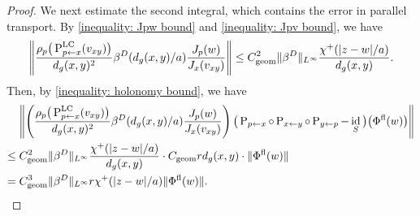\documentclass[a4paper,oneside,12pt]{amsart}
\theoremstyle{plain}
\theoremstyle{definition}
\theoremstyle{remark}
\DeclarePairedDelimiter{\abs}{\lvert}{\rvert}
\DeclarePairedDelimiter{\norm}{\lVert}{\rVert}
\DeclareMathOperator{\id}{id}
\newcommand{\paralleltransport}[2]{\operatorname{P}_{#2 \gets #1}}
\newcommand{\paralleltransportLC}[2]{\paralleltransport{#1}{#2}^{\mathrm{LC}}}
\newcommand{\cliffordmultiplication}{\rho}
\newcommand{\cutoff}{\beta}
\newcommand{\cutoffDirac}{\cutoff^D}
\newcommand{\cutoffupper}{\chi^+}
\newcommand{\flatmodel}[1]{#1^{\mathrm{fl}}}
\newcommand{\constantgeometric}{C_{\mathrm{geom}}}
\begin{document}
\begin{proof}
  We next estimate the second integral, which contains the error in parallel transport.
  By \eqref{inequality: Jpw bound} and \eqref{inequality: Jpv bound}, we have
  \begin{equation}
    \norm*{\frac{\cliffordmultiplication_p \big(\paralleltransportLC{x}{p}(v_{xy})\big) }{d_g(x,y)^2} \cutoffDirac(d_g(x,y)/a) \frac{J_p(w)}{J_x(v_{xy})}} \le \constantgeometric^2 \norm{\cutoffDirac}_{L^{\infty}} \frac{\cutoffupper(\abs{z-w}/a)}{d_g(x,y)}.
  \end{equation}
  Then, by \eqref{inequality: holonomy bound}, we have
  \begin{equation}
    \begin{aligned}
    & \norm*{\left( \frac{\cliffordmultiplication_p \big(\paralleltransportLC{x}{p}(v_{xy})\big) }{d_g(x,y)^2} \cutoffDirac(d_g(x,y)/a) \frac{J_p(w)}{J_x(v_{xy})} \right) \big(\paralleltransport{x}{p} \circ \paralleltransport{y}{x} \circ \paralleltransport{p}{y} - \id_S\big) \big(\flatmodel{\Phi}(w)\big)} \\
    \le{}& \constantgeometric^2 \norm{\cutoffDirac}_{L^{\infty}} \frac{\cutoffupper(\abs{z-w}/a)}{d_g(x,y)} \cdot \constantgeometric r d_g(x,y) \cdot \norm{\flatmodel{\Phi}(w)} \\
    ={}& \constantgeometric^3 \norm{\cutoffDirac}_{L^{\infty}} r \cutoffupper(\abs{z-w}/a) \norm{\flatmodel{\Phi}(w)}.
    \end{aligned}
  \end{equation}


\end{proof}
\end{document}
